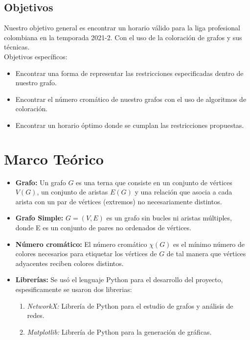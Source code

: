 \documentclass[11pt]{article}
\begin{document}
\begin{multicols}{2}
            \subsection{Objetivos}
                Nuestro objetivo general es encontrar un horario válido para la liga profesional colombiana en la temporada 2021-2. Con el uso de la coloración 
                de grafos y sus técnicas.\\[10pt]
                Objetivos específicos:
                \begin{itemize}
                    \item Encontrar una forma de representar las restricciones especificadas dentro de nuestro grafo. 
                    \item Encontrar el número cromático de nuestro grafos con el uso de algoritmos de coloración.
                    \item Encontrar un horario óptimo donde se cumplan las restricciones propuestas.
                \end{itemize}

        \section{Marco Teórico}

            \begin{itemize}
                \item \textbf{Grafo:} Un grafo $G$ es una terna que consiste en un conjunto de vértices $V(G)$, un conjunto 
                de aristas $E(G)$ y una relación que asocia a cada arista con un par de vértices (extremos) 
                no necesariamente distintos.
                \item \textbf{Grafo Simple:} $G = (V,E)$ es un grafo sin bucles ni aristas múltiples, donde E es un conjunto 
                de pares no ordenados de vértices.
                \item \textbf{Número cromático:} El número cromático $\chi(G)$ es el mínimo número de colores necesarios 
                para etiquetar los vértices de $G$ de tal manera que vértices adyacentes reciben colores 
                distintos.  
                \item \textbf{Librerías:} Se usó el lenguaje Python para el desarrollo del proyecto, espesificamente se usaron dos librerias:
                \begin{enumerate}
                    \item \textit{NetworkX:} Librería de Python para el estudio de grafos y análisis de redes.
                    \item \textit{Matplotlib:} Librería de Python para la generación de gráficas.
                \end{enumerate}        
            \end{itemize}
        

\end{multicols}
\end{document}
